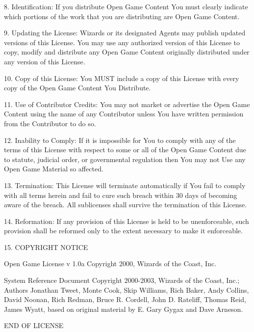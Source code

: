 \documentclass{article}
\begin{document}
\vspace{12pt}
8. Identification: If you distribute Open Game Content You must clearly indicate 
which portions of the work that you are distributing are Open Game Content. 

\vspace{12pt}
9. Updating the License: Wizards or its designated Agents may publish updated versions 
of this License. You may use any authorized version of this License to copy, modify 
and distribute any Open Game Content originally distributed under any version of 
this License. 

\vspace{12pt}
10. Copy of this License: You MUST include a copy of this License with every copy 
of the Open Game Content You Distribute. 

\vspace{12pt}
11. Use of Contributor Credits: You may not market or advertise the Open Game Content 
using the name of any Contributor unless You have written permission from the Contributor 
to do so. 

\vspace{12pt}
12. Inability to Comply: If it is impossible for You to comply with any of the 
terms of this License with respect to some or all of the Open Game Content due 
to statute, judicial order, or governmental regulation then You may not Use any 
Open Game Material so affected. 

\vspace{12pt}
13. Termination: This License will terminate automatically if You fail to comply 
with all terms herein and fail to cure such breach within 30 days of becoming aware 
of the breach. All sublicenses shall survive the termination of this License. 

\vspace{12pt}
14. Reformation: If any provision of this License is held to be unenforceable, 
such provision shall be reformed only to the extent necessary to make it enforceable. 

\vspace{12pt}
15. COPYRIGHT NOTICE 

Open Game License v 1.0a Copyright 2000, Wizards of the Coast, Inc. 

\vspace{12pt}
System Reference Document Copyright 2000-2003, Wizards of the Coast, Inc.; Authors 
Jonathan Tweet, Monte Cook, Skip Williams, Rich Baker, Andy Collins, David Noonan, 
Rich Redman, Bruce R. Cordell, John D. Rateliff, Thomas Reid, James Wyatt, based 
on original material by E. Gary Gygax and Dave Arneson. 

\vspace{12pt}
END OF LICENSE 

\newpage
\end{document}
